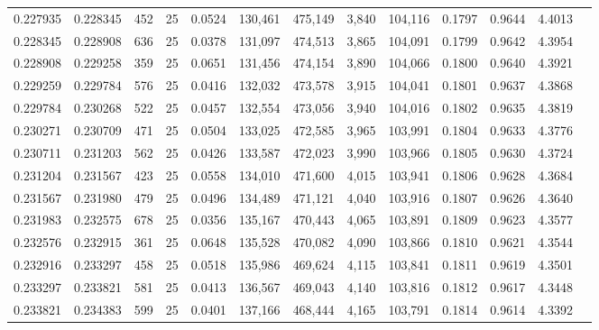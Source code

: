 \begin{tabular}{rrrrrrrrrrrrr}
0.227935 & 0.228345 &   452 &  25 &                                     0.0524 & 130,461 & 475,149 &   3,840 & 104,116 & 0.1797 & 0.9644 & 4.4013 \\
0.228345 & 0.228908 &   636 &  25 &                                     0.0378 & 131,097 & 474,513 &   3,865 & 104,091 & 0.1799 & 0.9642 & 4.3954 \\
0.228908 & 0.229258 &   359 &  25 &                                     0.0651 & 131,456 & 474,154 &   3,890 & 104,066 & 0.1800 & 0.9640 & 4.3921 \\
0.229259 & 0.229784 &   576 &  25 &                                     0.0416 & 132,032 & 473,578 &   3,915 & 104,041 & 0.1801 & 0.9637 & 4.3868 \\
0.229784 & 0.230268 &   522 &  25 &                                     0.0457 & 132,554 & 473,056 &   3,940 & 104,016 & 0.1802 & 0.9635 & 4.3819 \\
0.230271 & 0.230709 &   471 &  25 &                                     0.0504 & 133,025 & 472,585 &   3,965 & 103,991 & 0.1804 & 0.9633 & 4.3776 \\
0.230711 & 0.231203 &   562 &  25 &                                     0.0426 & 133,587 & 472,023 &   3,990 & 103,966 & 0.1805 & 0.9630 & 4.3724 \\
0.231204 & 0.231567 &   423 &  25 &                                     0.0558 & 134,010 & 471,600 &   4,015 & 103,941 & 0.1806 & 0.9628 & 4.3684 \\
0.231567 & 0.231980 &   479 &  25 &                                     0.0496 & 134,489 & 471,121 &   4,040 & 103,916 & 0.1807 & 0.9626 & 4.3640 \\
0.231983 & 0.232575 &   678 &  25 &                                     0.0356 & 135,167 & 470,443 &   4,065 & 103,891 & 0.1809 & 0.9623 & 4.3577 \\
0.232576 & 0.232915 &   361 &  25 &                                     0.0648 & 135,528 & 470,082 &   4,090 & 103,866 & 0.1810 & 0.9621 & 4.3544 \\
0.232916 & 0.233297 &   458 &  25 &                                     0.0518 & 135,986 & 469,624 &   4,115 & 103,841 & 0.1811 & 0.9619 & 4.3501 \\
0.233297 & 0.233821 &   581 &  25 &                                     0.0413 & 136,567 & 469,043 &   4,140 & 103,816 & 0.1812 & 0.9617 & 4.3448 \\
0.233821 & 0.234383 &   599 &  25 &                                     0.0401 & 137,166 & 468,444 &   4,165 & 103,791 & 0.1814 & 0.9614 & 4.3392 \\

\end{tabular}
